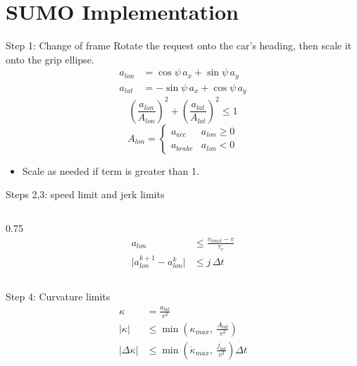 \documentclass[aspectratio=169,11pt]{beamer}
\begin{document}
\section{SUMO Implementation}

\begin{frame}{Step 1: Change of frame}
  Rotate the request onto the car's heading, then scale it onto the grip ellipse.
  \begin{align*}
    a_{lon} &= \cos\psi\, a_x + \sin\psi\, a_y \\
    a_{lat} &= -\sin\psi\, a_x + \cos\psi\, a_y
  \end{align*}
  \[
    \left(\frac{a_{lon}}{A_{lon}}\right)^2 + \left(\frac{a_{lat}}{A_{lat}}\right)^2 \le 1
  \]
  \[
    A_{lon} = \begin{cases} a_{acc} & a_{lon} \ge 0 \\ a_{brake} & a_{lon} < 0 \end{cases}
  \]
  \begin{itemize}\small
    \item Scale as needed if term is greater than 1.
  \end{itemize}
\end{frame}

\begin{frame}{Steps 2,3: speed limit and jerk limits}
  \begin{columns}[c]
    \begin{column}{0.75\textwidth}
      \begin{align*}
        a_{lon} &\le \frac{v_{limit} - v}{\tau_v} \\[6pt]
        \big|a_{lon}^{k+1} - a_{lon}^{k}\big| &\le j\,\Delta t
      \end{align*}
    \end{column}
   
  \end{columns}
\end{frame}

\begin{frame}{Step 4: Curvature limits}
  \begin{align*}
    \kappa &= \frac{a_{lat}}{v^2} \\
    |\kappa| &\le \min\!\left(\kappa_{max},\ \frac{A_{lat}}{v^2}\right) \\
    |\Delta\kappa| &\le \min\!\left(\dot{\kappa}_{max},\ \frac{j_{lat}}{v^2}\right)\Delta t
  \end{align*}
\end{frame}
\end{document}
